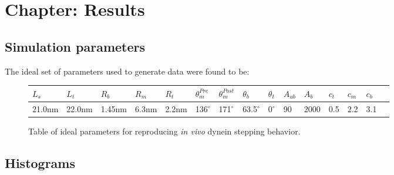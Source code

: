 \documentclass[10pt]{article} %
\begin{document}


\section{Chapter: Results}

\subsection{Simulation parameters}
The ideal set of parameters used to generate data were found to be:

\begin{figure}[h]
  \centering
  \begin{tabular}{| l | l | l | l | l | l | l | l | l | l | l | l | l | l | l |}
    \hline
    $L_s$ & $L_t$ & $R_b$ & $R_m$ & $R_t$ & $\theta_{m}^{Pre}$ & $\theta_{m}^{Post}$ & $\theta_{b}$ & $\theta_{t}$ & $A_{ub}$ & $A_b$ & $c_t$ & $c_m$  &$c_b$\\ \hline
    21.0nm & 22.0nm & 1.45nm & 6.3nm & 2.2nm & 136$^{\circ}$ & 171$^{\circ}$ & 63.5$^{\circ}$ & 0$^{\circ}$ & 90 & 2000 & 0.5 & 2.2  & 3.1\\ \hline
  \end{tabular}
  \caption{Table of ideal parameters for reproducing \textit{in vivo} dynein stepping behavior.}
  \label{final-parameter-table}
\end{figure}

\subsection{Histograms}

\end{document}
